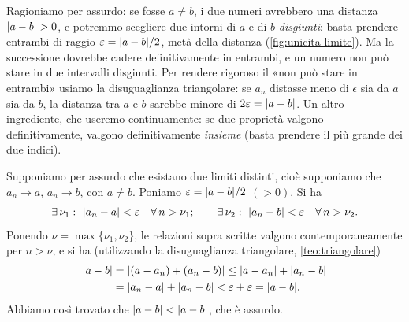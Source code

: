 \begin{strategia}
Ragioniamo per assurdo: se fosse $a\neq b$, i due numeri avrebbero una distanza
$\lvert a-b\rvert>0$, e potremmo scegliere due intorni di $a$ e di $b$ \emph{disgiunti}: basta
prendere entrambi di raggio $\varepsilon=\lvert a-b\rvert/2$, metà della distanza
(\cref{fig:unicita-limite}). Ma la successione dovrebbe cadere definitivamente in
entrambi, e un numero non può stare in due intervalli disgiunti. Per rendere rigoroso
il «non può stare in entrambi» usiamo la disuguaglianza triangolare: se $a_{n}$ distasse
meno di $\epsilon$ sia da $a$ sia da $b$, la distanza tra $a$ e $b$ sarebbe minore di
$2\varepsilon=\lvert a-b\rvert$. Un altro ingrediente, che useremo continuamente: se due proprietà
valgono definitivamente, valgono definitivamente \emph{insieme} (basta prendere il più
grande dei due indici).
\end{strategia}

\begin{dimostrazione}
Supponiamo per assurdo che esistano due limiti distinti, cioè supponiamo che
$a_{n}\to a$, $a_{n}\to b$, con $a\neq b$. Poniamo $\varepsilon=\lvert a-b\rvert/2$ $(>0)$. Si ha
\begin{equation}\label{eq:unicita-passo}
  \exists\,\nu_{1}:\ \lvert a_{n}-a\rvert<\varepsilon\quad\forall\, n>\nu_{1}; \qquad
  \exists\,\nu_{2}:\ \lvert a_{n}-b\rvert<\varepsilon\quad\forall\, n>\nu_{2}.
\end{equation}
Ponendo $\nu=\max\{\nu_{1},\nu_{2}\}$, le relazioni sopra scritte valgono
contemporaneamente per $n>\nu$, e si ha (utilizzando la disuguaglianza triangolare,
\cref{teo:triangolare})
\begin{equation}\label{eq:unicita-triangolare}
\begin{split}
  \lvert a-b\rvert&=\lvert (a-a_{n})+(a_{n}-b)\rvert\le\lvert a-a_{n}\rvert+\lvert a_{n}-b\rvert\\
  &=\lvert a_{n}-a\rvert+\lvert a_{n}-b\rvert<\varepsilon+\varepsilon=\lvert a-b\rvert.
\end{split}
\end{equation}
Abbiamo così trovato che $\lvert a-b\rvert<\lvert a-b\rvert$, che è assurdo.
\end{dimostrazione}

